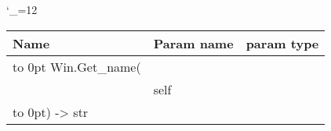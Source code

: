 \begingroup \catcode`\_=12 \tt
\begin{tabular}{lll}
\toprule
\textrm{Name}&\textrm{Param name}&\textrm{param type}\\
\midrule
\hbox to 0pt {Win.Get_name(\hss}\\
& self\\
\hbox to 0pt{) -> str\hss}\\
\bottomrule
\end{tabular}
\endgroup
